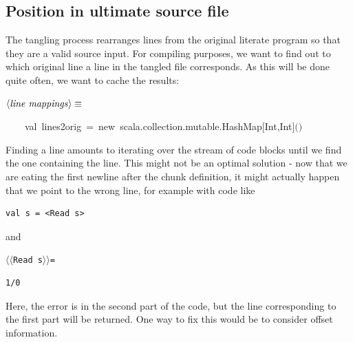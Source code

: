 \documentclass[a4paper,12pt]{article}
\begin{document}
\subsection{Position in ultimate source file}
The tangling process rearranges lines from the original literate program
so that they are a valid source input. For compiling purposes, we want to
find out to which original line a line in the tangled file corresponds. As
this will be done quite often, we want to cache the results:

$\left<\mbox{\emph{line mappings}}\right>\equiv$
\begin{program}~~~~{\vem val}~lines2orig~=~{\vem new}~scala.collection.mutable.HashMap$[$Int,Int$]$$($$)$
\\[0.5em]\end{program}
Finding a line amounts to iterating over the stream of code blocks until
we find the one containing the line. This might not be an optimal solution -
now that we are eating the first newline after the chunk definition, it
might actually happen that we point to the wrong line, for example with code
like 

\begin{verbatim}
val s = <Read s>
\end{verbatim}

and

\texttt{$\langle$$\langle$Read s$\rangle$$\rangle$=}
\begin{verbatim}
1/0
\end{verbatim}

Here, the error is in the second part of the code, but the line corresponding
to the first part will be returned. One way to fix this would be to consider
offset information.
\end{document}

